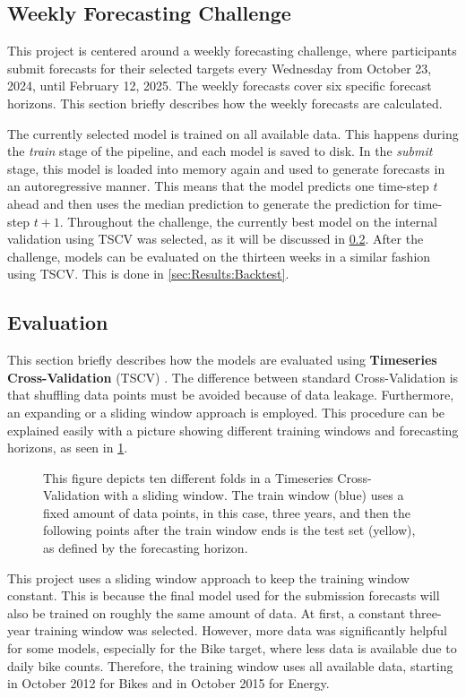 \subsection{Weekly Forecasting Challenge}
\label{sec:Methodology:ForecastingChallenge}

This project is centered around a weekly forecasting challenge, where participants submit
forecasts for their selected targets every Wednesday from October 23, 2024, until February 12, 2025. The weekly forecasts cover six specific forecast horizons. This section briefly describes how the weekly forecasts are calculated.

The currently selected model is trained on all available data. This happens during the \textit{train} stage of the pipeline, and each model is saved to disk. In the \textit{submit} stage, this model is loaded into memory again and used to generate forecasts in an autoregressive manner. This means that the model predicts one time-step $t$ ahead and then uses the median prediction to generate the prediction for time-step $t+1$. Throughout the challenge, the currently best model on the internal validation using TSCV was selected, as it will be discussed in \cref{sec:Methodology:Evaluation}. After the challenge, models can be evaluated on the thirteen weeks in a similar fashion using TSCV. This is done in \cref{sec:Results:Backtest}.

\subsection{Evaluation}
\label{sec:Methodology:Evaluation}

This section briefly describes how the models are evaluated using \textbf{Timeseries Cross-Validation} (TSCV) \parencite[Chapter~5.10]{hyndman_forecasting_2021}. The difference between standard Cross-Validation \parencite[241--248]{hastie_elements_2009} is that shuffling data points must be avoided because of data leakage. Furthermore, an expanding or a sliding window approach is employed. This procedure can be explained easily with a picture showing different training windows and forecasting horizons, as seen in \cref{fig:tscv}.
\begin{figure}[htbp]
    \centering
    
    \caption{This figure depicts ten different folds in a Timeseries Cross-Validation with a sliding window. The train window (blue) uses a fixed amount of data points, in this case, three years, and then the following points after the train window ends is the test set (yellow), as defined by the forecasting horizon.}
    \label{fig:tscv}
\end{figure}
This project uses a sliding window approach to keep the training window constant. This is because the final model used for the submission forecasts will also be trained on roughly the same amount of data. At first, a constant three-year training window was selected. However, more data was significantly helpful for some models, especially for the Bike target, where less data is available due to daily bike counts. Therefore, the training window uses all available data, starting in October 2012 for Bikes and in October 2015 for Energy.

